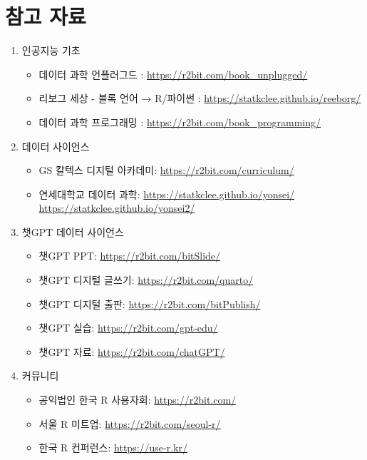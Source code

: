 \documentclass[
  letterpaper,
  chapter,a4paper,showtrims,openright,hidelinks]{oblivoir}
\providecommand{\tightlist}{%
  \setlength{\itemsep}{0pt}\setlength{\parskip}{0pt}}\usepackage{longtable,booktabs,array}
\begin{document}
\hypertarget{uxcc38uxace0-uxc790uxb8cc}{%
\section*{참고 자료}\label{uxcc38uxace0-uxc790uxb8cc}}


\begin{enumerate}
\def\labelenumi{\arabic{enumi}.}
\tightlist
\item
  인공지능 기초

  \begin{itemize}
  \tightlist
  \item
    데이터 과학 언플러그드 : \url{https://r2bit.com/book_unplugged/}
  \item
    리보그 세상 - 블록 언어 → R/파이썬 :
    \url{https://statkclee.github.io/reeborg/}
  \item
    데이터 과학 프로그래밍 : \url{https://r2bit.com/book_programming/}
  \end{itemize}
\item
  데이터 사이언스

  \begin{itemize}
  \tightlist
  \item
    GS 칼텍스 디지털 아카데미: \url{https://r2bit.com/curriculum/}
  \item
    연세대학교 데이터 과학: \url{https://statkclee.github.io/yonsei/}
    \url{https://statkclee.github.io/yonsei2/}
  \end{itemize}
\item
  챗GPT 데이터 사이언스

  \begin{itemize}
  \tightlist
  \item
    챗GPT PPT: \url{https://r2bit.com/bitSlide/}
  \item
    챗GPT 디지털 글쓰기: \url{https://r2bit.com/quarto/}
  \item
    챗GPT 디지털 출판: \url{https://r2bit.com/bitPublish/}
  \item
    챗GPT 실습: \url{https://r2bit.com/gpt-edu/}
  \item
    챗GPT 자료: \url{https://r2bit.com/chatGPT/}
  \end{itemize}
\item
  커뮤니티

  \begin{itemize}
  \tightlist
  \item
    공익법인 한국 R 사용자회: \url{https://r2bit.com/}
  \item
    서울 R 미트업: \url{https://r2bit.com/seoul-r/}
  \item
    한국 R 컨퍼런스: \url{https://use-r.kr/}
  \end{itemize}
\end{enumerate}
\end{document}
